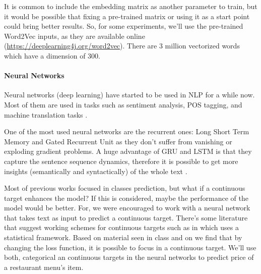 \documentclass[11pt,letterpaper]{article}
\begin{document}
It is common to include the embedding matrix as another parameter to train, but it would be possible that fixing a pre-trained matrix or using it as a start point could bring better results. So, for some experiments, we'll use the pre-trained Word2Vec inputs, as they are available online (\url{https://deeplearning4j.org/word2vec}). There are 3 million vectorized words which have a dimension of 300.  

\paragraph{Neural Networks}
Neural networks (deep learning) have started to be used in NLP for a while now. Most of them are used in tasks such as sentiment analysis, POS tagging, and machine translation tasks \cite{cho2015natural}. 

One of the most used neural networks are the recurrent ones: Long Short Term Memory and Gated Recurrent Unit \cite{cho2015natural} as they don't suffer from vanishing or exploding gradient problems. A huge advantage of GRU and LSTM is that they capture the sentence sequence dynamics, therefore it is possible to get more insights (semantically and syntactically) of the whole text \cite{gers2000learning,cho2014learning,cho2015natural}.


Most of previous works focused in classes prediction, but what if a continuous target enhances the model? If this is considered, maybe the performance of the model would be better. For, we were encouraged to work with a neural network that takes text as input to predict a continuous target.
There's some literature that suggest working schemes for continuous targets such as in \cite{regneural1991} which uses a statistical framework. Based on material seen in class and on \cite{cho2015natural} we find that by changing the loss function, it is possible to focus in a continuous target. We'll use both, categorical an continuous targets in the neural networks to predict price of a restaurant menu's item.
\end{document}
